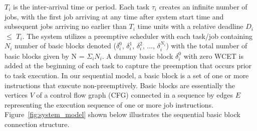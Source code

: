 \begin{math}T_{i}\end{math} is the inter-arrival time or period.
Each task \begin{math}\tau_{i}\end{math} creates an infinite number of jobs, with the first job arriving at any time after system start time and subsequent jobs arriving no earlier than \begin{math}T_{i}\end{math} time units with a relative deadline \begin{math}D_{i}\end{math} \begin{math}\leq\end{math} \begin{math}T_{i}\end{math}.  The system utilizes a preemptive scheduler with each task/job containing \begin{math}N_{i}\end{math} number of basic blocks denoted (\begin{math}\delta_{i}^{0}\end{math}, \begin{math}\delta_{i}^{1}\end{math}, \begin{math}\delta_{i}^{2}\end{math}, ..., \begin{math}\delta_{i}^{N_{i}}\end{math}) with the total number of basic blocks given by N = \begin{math}\Sigma_{i}\end{math}\begin{math}N_{i}\end{math}. A dummy basic block \begin{math}\delta_{i}^{0}\end{math} with zero WCET is added at the beginning of each task to capture the preemption that occurs prior to task execution.  In our sequential model, a basic block is a set of one or more instructions that execute non-preemptively.  Basic blocks are essentially the vertices $V$ of a control flow graph (CFG) connected in a sequence by edges $E$ representing the execution sequence of one or more job instructions. Figure~\ref{fig:system_model} shown below illustrates the sequential basic block connection structure.
